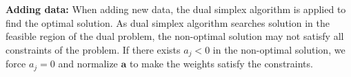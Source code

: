 \documentclass[letterpaper]{article}
\begin{document}
\indent \indent \textbf{Adding data:} When adding new data, the dual simplex algorithm is applied to find the optimal solution. As dual simplex algorithm searches solution in the feasible region of the dual problem, the non-optimal solution may not satisfy all constraints of the problem. If there exists $a_j < 0$ in the non-optimal solution, we force $a_j = 0$ and normalize $\mathbf{a}$ to make the weights satisfy the constraints. %

\end{document}
